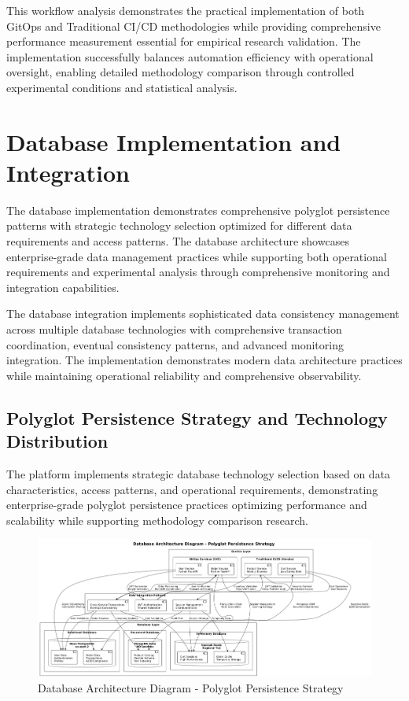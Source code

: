 This workflow analysis demonstrates the practical implementation of both GitOps and Traditional CI/CD methodologies while providing comprehensive performance measurement essential for empirical research validation. The implementation successfully balances automation efficiency with operational oversight, enabling detailed methodology comparison through controlled experimental conditions and statistical analysis.

\section{Database Implementation and Integration}

The database implementation demonstrates comprehensive polyglot persistence patterns with strategic technology selection optimized for different data requirements and access patterns. The database architecture showcases enterprise-grade data management practices while supporting both operational requirements and experimental analysis through comprehensive monitoring and integration capabilities.

The database integration implements sophisticated data consistency management across multiple database technologies with comprehensive transaction coordination, eventual consistency patterns, and advanced monitoring integration. The implementation demonstrates modern data architecture practices while maintaining operational reliability and comprehensive observability.

\subsection{Polyglot Persistence Strategy and Technology Distribution}

The platform implements strategic database technology selection based on data characteristics, access patterns, and operational requirements, demonstrating enterprise-grade polyglot persistence practices optimizing performance and scalability while supporting methodology comparison research.

\begin{figure}[H]
\centering
\includegraphics[width=1.0\textwidth]{figures/Database-Architecture-Diagram.png}
\caption{Database Architecture Diagram - Polyglot Persistence Strategy}
\label{fig:database-architecture-diagram}
\end{figure}

